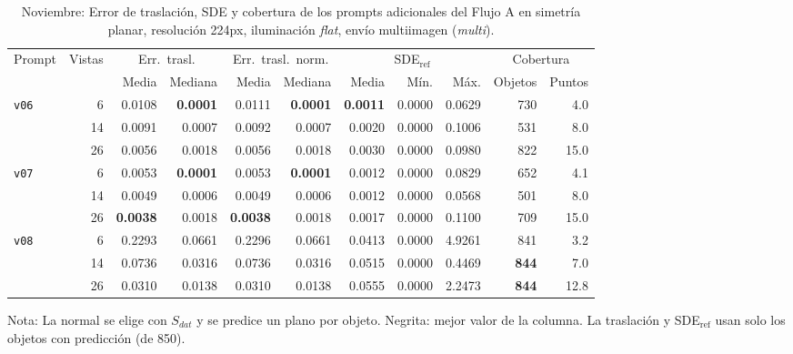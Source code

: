 \begin{table}[htbp]
\centering
\caption{Noviembre: Error de traslación, SDE y cobertura de los prompts adicionales del Flujo A en simetría planar, resolución 224px, iluminación \textit{flat}, envío multiimagen (\textit{multi}).}
\label{tab:nov_plane_adicionales_posicion}
\begin{lrbox}{\tablebox}
\begin{adjustbox}{max width=\textwidth}
\begin{tabular}{lrrrrrrrrrr}
\toprule
\multirow{2}{*}{Prompt} & \multirow{2}{*}{Vistas} & \multicolumn{2}{c}{Err.\ trasl.} & \multicolumn{2}{c}{Err.\ trasl.\ norm.} & \multicolumn{3}{c}{SDE$_{\mathrm{ref}}$} & \multicolumn{2}{c}{Cobertura} \\
\cmidrule(lr){3-4} \cmidrule(lr){5-6} \cmidrule(lr){7-9} \cmidrule(lr){10-11}
 &  & Media & Mediana & Media & Mediana & Media & Mín. & Máx. & Objetos & Puntos \\
\midrule
\multirow{3}{*}{\texttt{v06}} & 6 & 0.0108 & \textbf{0.0001} & 0.0111 & \textbf{0.0001} & \textbf{0.0011} & 0.0000 & 0.0629 & 730 & 4.0 \\
 & 14 & 0.0091 & 0.0007 & 0.0092 & 0.0007 & 0.0020 & 0.0000 & 0.1006 & 531 & 8.0 \\
 & 26 & 0.0056 & 0.0018 & 0.0056 & 0.0018 & 0.0030 & 0.0000 & 0.0980 & 822 & 15.0 \\
\midrule
\multirow{3}{*}{\texttt{v07}} & 6 & 0.0053 & \textbf{0.0001} & 0.0053 & \textbf{0.0001} & 0.0012 & 0.0000 & 0.0829 & 652 & 4.1 \\
 & 14 & 0.0049 & 0.0006 & 0.0049 & 0.0006 & 0.0012 & 0.0000 & 0.0568 & 501 & 8.0 \\
 & 26 & \textbf{0.0038} & 0.0018 & \textbf{0.0038} & 0.0018 & 0.0017 & 0.0000 & 0.1100 & 709 & 15.0 \\
\midrule
\multirow{3}{*}{\texttt{v08}} & 6 & 0.2293 & 0.0661 & 0.2296 & 0.0661 & 0.0413 & 0.0000 & 4.9261 & 841 & 3.2 \\
 & 14 & 0.0736 & 0.0316 & 0.0736 & 0.0316 & 0.0515 & 0.0000 & 0.4469 & \textbf{844} & 7.0 \\
 & 26 & 0.0310 & 0.0138 & 0.0310 & 0.0138 & 0.0555 & 0.0000 & 2.2473 & \textbf{844} & 12.8 \\
\bottomrule
\end{tabular}
\end{adjustbox}
\end{lrbox}
\usebox{\tablebox}

\vspace{1.5ex}
\begin{minipage}{\wd\tablebox}
\footnotesize
Nota: La normal se elige con $S_{dat}$ y se predice un plano por objeto. Negrita: mejor valor de la columna. La traslación y SDE$_{\mathrm{ref}}$ usan solo los objetos con predicción (de 850).
\end{minipage}
\end{table}

